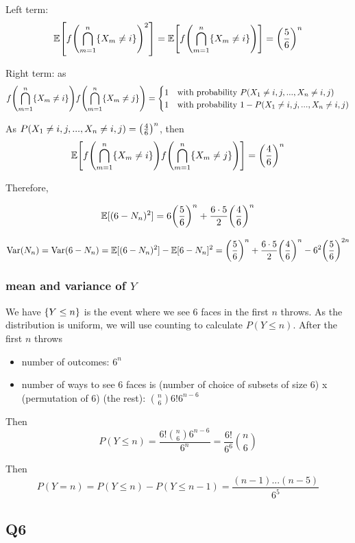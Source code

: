 \documentclass{article}
\begin{document}
Left term:
$$
    \Exp\bracket*{f\tuple*{\bigcap_{m=1}^n \set{X_m \neq i}}^2 } = \Exp\bracket*{f\tuple*{\bigcap_{m=1}^n \set{X_m \neq i}} } = \tuple*{\frac{5}{6}}^n
$$

Right term: as
$$
    f\tuple*{\bigcap_{m=1}^n \set{X_m \neq i}} f\tuple*{\bigcap_{m=1}^n \set{X_m \neq j}} = \begin{cases}
        1 &\text{with probability $P(X_1 \neq i,j, ..., X_n \neq i,j)$} \\
        1 &\text{with probability $1 - P(X_1 \neq i,j, ..., X_n \neq i,j)$} \\
    \end{cases}
$$

As $P(X_1 \neq i,j, ..., X_n \neq i,j) = \tuple*{\frac{4}{6}}^n$, then
$$
    \Exp\bracket*{f\tuple*{\bigcap_{m=1}^n \set{X_m \neq i}} f\tuple*{\bigcap_{m=1}^n \set{X_m \neq j}}} = \tuple*{\frac{4}{6}}^n
$$

Therefore,

$$
    \Exp[(6 - N_n)^2] = 6 \tuple*{\frac{5}{6}}^n + \frac{6 \cdot 5}{2} \tuple*{\frac{4}{6}}^n
$$

$$
    \Var(N_n) = \Var(6 - N_n) = \Exp[(6 - N_n)^2] - \Exp[6 - N_n]^2 = \tuple*{\frac{5}{6}}^n + \frac{6 \cdot 5}{2} \tuple*{\frac{4}{6}}^n - 6^2 \tuple*{\frac{5}{6}}^{2n}
$$

\subsubsection{mean and variance of $Y$}

We have $\set{Y \leq n}$ is the event where we see $6$ faces in the first $n$ throws. As the distribution is uniform, we will use counting to calculate $P(Y \leq n)$. After the first $n$ throws

\begin{itemize}
    \item number of outcomes: $6^n$
    \item number of ways to see $6$ faces is (number of choice of subsets of size $6$) x (permutation of $6$) (the rest): ${n \choose 6} 6! 6^{n-6}$ 
\end{itemize}

Then 
$$
    P(Y \leq n) = \frac{6! {n \choose 6}  6^{n-6}}{6^n} = \frac{6!}{6^6} {n \choose 6}
$$

Then
$$
    P(Y=n) = P(Y \leq n) - P(Y \leq n-1) = \frac{(n-1) ... (n-5)}{6^5}
$$

\subsection{Q6}
\end{document}
